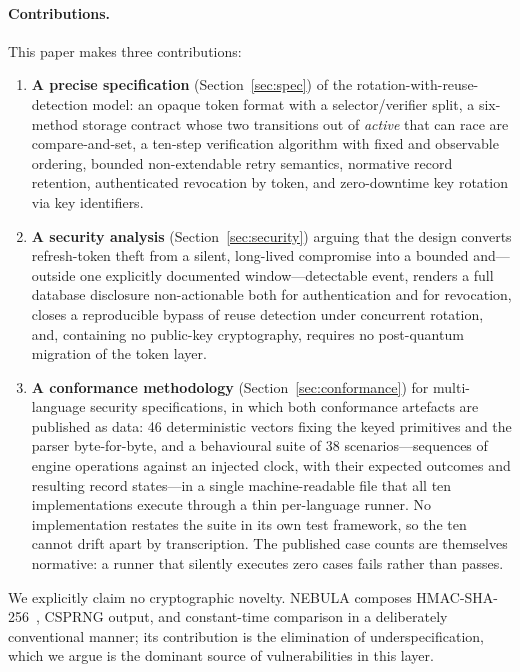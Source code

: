 \documentclass[11pt]{article}
\begin{document}
\paragraph{Contributions.} This paper makes three contributions:
\begin{enumerate}[leftmargin=1.4em]
  \item \textbf{A precise specification} (Section~\ref{sec:spec}) of the
  rotation-with-reuse-detection model: an opaque token format with a
  selector/verifier split, a six-method storage contract whose two
  transitions out of \textit{active} that can race are compare-and-set, a ten-step
  verification algorithm with fixed and observable ordering, bounded
  non-extendable retry semantics, normative record retention, authenticated
  revocation by token, and zero-downtime key rotation via key identifiers.
  \item \textbf{A security analysis} (Section~\ref{sec:security}) arguing
  that the design converts refresh-token theft from a silent, long-lived
  compromise into a bounded and---outside one explicitly documented
  window---detectable event, renders a full database disclosure
  non-actionable both for authentication and for revocation, closes a
  reproducible bypass of reuse detection under concurrent rotation, and,
  containing no public-key cryptography, requires no post-quantum migration
  of the token layer.
  \item \textbf{A conformance methodology} (Section~\ref{sec:conformance})
  for multi-language security specifications, in which both conformance
  artefacts are published as data: 46 deterministic vectors fixing the keyed
  primitives and the parser byte-for-byte, and a behavioural suite of 38
  scenarios---sequences of engine operations against an injected clock, with
  their expected outcomes and resulting record states---in a single
  machine-readable file that all ten implementations execute through a thin
  per-language runner. No implementation restates the suite in its own test
  framework, so the ten cannot drift apart by transcription. The published
  case counts are themselves normative: a runner that silently executes zero
  cases fails rather than passes.
\end{enumerate}

We explicitly claim no cryptographic novelty. NEBULA composes
HMAC-SHA-256~\cite{rfc2104,fips198}, CSPRNG output, and constant-time
comparison in a deliberately conventional manner; its contribution is the
elimination of underspecification, which we argue is the dominant source of
vulnerabilities in this layer.
\end{document}

